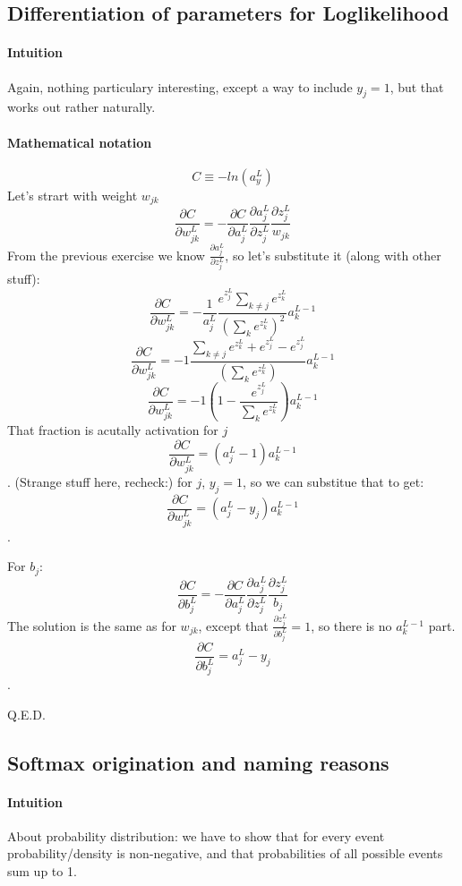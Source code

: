 \documentclass{article}
\begin{document}
\subsection{Differentiation of parameters for Loglikelihood}
\paragraph{Intuition}
Again, nothing particulary interesting, except a way to include $y_j = 1$, but that works out rather naturally.
\paragraph{Mathematical notation}
$$C \equiv - ln(a^L_y)$$
Let's strart with weight $w_{jk}$
$$\frac{\partial C}{\partial w^L_{jk}} = - \frac{\partial C}{\partial a^L_{j}} \frac{\partial a^L_{j}}{\partial z^L_j}\frac{\partial z^L_j}{w_{jk}}$$
From the previous exercise we know $\frac{\partial a^L_j}{\partial z^L_j}$, so let's substitute it (along with other stuff):
$$\frac{\partial C}{\partial w^L_{jk}} = - \frac{1}{a^L_j}  \frac{e^{z^L_j} \sum_{k \neq j} e^{z^L_k}}{(\sum_{k} e^{z^L_k})^2}  a^{L-1}_k$$
$$\frac{\partial C}{\partial w^L_{jk}} = - 1 \frac{\sum_{k \neq j} e^{z^L_k} + e^{z^L_j} - e^{z^L_j}}{ (\sum_{k} e^{z^L_k}) }  a^{L-1}_k$$
$$\frac{\partial C}{\partial w^L_{jk}} = - 1(1 - \frac{e^{z^L_j}}{ \sum_{k} e^{z^L_k}}) a^{L-1}_k$$
That fraction is acutally activation for $j$
$$\frac{\partial C}{\partial w^L_{jk}} = (a^{L}_j - 1) a^{L-1}_k$$.
(Strange stuff here, recheck:)
for $j$, $y_j = 1$, so we can substitue that to get:
$$\frac{\partial C}{\partial w^L_{jk}} = (a^{L}_j - y_j) a^{L-1}_k$$.

For $b_j$:
$$\frac{\partial C}{\partial b^L_{j}} = - \frac{\partial C}{\partial a^L_{j}} \frac{\partial a^L_{j}}{\partial z^L_j}\frac{\partial z^L_j}{b_{j}}$$
The solution is the same as for $w_{jk}$, except that $\frac{\partial z^L_j}{\partial b^L_{j}} = 1$, so there is no $a^{L-1}_k$ part.
$$\frac{\partial C}{\partial b^L_{j}} = a^{L}_j - y_j$$.

Q.E.D.

\subsection{Softmax origination and naming reasons}
\paragraph{Intuition}
About probability distribution: we have to show that for every event probability/density is non-negative,
and that probabilities of all possible events sum up to 1.
\end{document}
